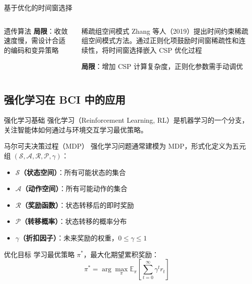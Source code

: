 {\begin{frame}{基于优化的时间窗选择}
\begin{columns}[T]
\begin{block}{遗传算法}
            \textbf{局限}：收敛速度慢，需设计合适的编码和变异策略
        \end{block}

        \begin{block}{稀疏组空间模式}
            \scriptsize
            Zhang 等人（2019）提出时间约束稀疏组空间模式方法\cite{zhang2019temporally}。通过正则化项鼓励时间窗稀疏性和连续性，将时间窗选择嵌入 CSP 优化过程
            
            \textbf{局限}：增加 CSP 计算复杂度，正则化参数需手动调优
        \end{block}
    \end{columns}

\end{frame}

\subsection{强化学习在 BCI 中的应用}

\begin{frame}{强化学习基础}
    强化学习（Reinforcement Learning, RL）是机器学习的一个分支，关注智能体如何通过与环境交互学习最优策略\cite{sutton2018reinforcement}。
    \begin{block}{马尔可夫决策过程（MDP）}
        \scriptsize
        强化学习问题通常建模为 MDP，形式化定义为五元组 $(\mathcal{S}, \mathcal{A}, \mathcal{R}, \mathcal{P}, \gamma)$：
        \begin{itemize}
            \item \textbf{$\mathcal{S}$（状态空间）}：所有可能状态的集合
            \item \textbf{$\mathcal{A}$（动作空间）}：所有可能动作的集合
            \item \textbf{$\mathcal{R}$（奖励函数）}：状态转移后的即时奖励
            \item \textbf{$\mathcal{P}$（转移概率）}：状态转移的概率分布
            \item \textbf{$\gamma$（折扣因子）}：未来奖励的权重，$0 \leq \gamma \leq 1$
        \end{itemize}
    \end{block}
    \begin{alertblock}{优化目标}
        \scriptsize
        学习最优策略 $\pi^*$，最大化期望累积奖励：
        \begin{equation*}
        \pi^* = \arg\max_{\pi} \mathbb{E}_{\pi} \left[ \sum_{t=0}^{\infty} \gamma^t r_t \right]
        \end{equation*}
    \end{alertblock}
\end{frame}

}
